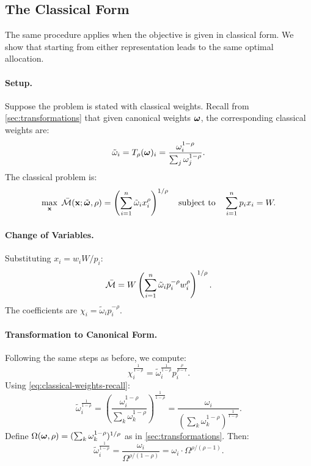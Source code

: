 \subsection{The Classical Form}
\label{subsec:classical-transform}

The same procedure applies when the objective is given in classical form. We show that starting from either representation leads to the same optimal allocation.

\paragraph{Setup.}
Suppose the problem is stated with classical weights. Recall from \cref{sec:transformations} that given canonical weights $\boldsymbol{\omega}$, the corresponding classical weights are:
\begin{equation}
\label{eq:classical-weights-recall}
\tilde{\omega}_i = T_\rho(\boldsymbol{\omega})_i = \frac{\omega_i^{1-\rho}}{\sum_j \omega_j^{1-\rho}}.
\end{equation}
The classical problem is:
\begin{equation}
\label{eq:classical-general}
\max_{\mathbf{x}} \; \bar{\mathcal{M}}(\mathbf{x}; \tilde{\boldsymbol{\omega}}, \rho) = \left( \sum_{i=1}^{n} \tilde{\omega}_i x_i^\rho \right)^{1/\rho} \quad \text{subject to} \quad \sum_{i=1}^{n} p_i x_i = W.
\end{equation}

\paragraph{Change of Variables.}
Substituting $x_i = w_i W / p_i$:
\[
\bar{\mathcal{M}} = W \left( \sum_{i=1}^{n} \tilde{\omega}_i p_i^{-\rho} w_i^\rho \right)^{1/\rho}.
\]
The coefficients are $\chi_i = \tilde{\omega}_i p_i^{-\rho}$.

\paragraph{Transformation to Canonical Form.}
Following the same steps as before, we compute:
\[
\chi_i^{\frac{1}{1-\rho}} = \tilde{\omega}_i^{\frac{1}{1-\rho}} p_i^{\frac{\rho}{\rho-1}}.
\]
Using \cref{eq:classical-weights-recall}:
\[
\tilde{\omega}_i^{\frac{1}{1-\rho}} = \left( \frac{\omega_i^{1-\rho}}{\sum_k \omega_k^{1-\rho}} \right)^{\frac{1}{1-\rho}} = \frac{\omega_i}{\left( \sum_k \omega_k^{1-\rho} \right)^{\frac{1}{1-\rho}}}.
\]
Define $\Omega(\boldsymbol{\omega}, \rho) = (\sum_k \omega_k^{1-\rho})^{1/\rho}$ as in \cref{sec:transformations}. Then:
\[
\tilde{\omega}_i^{\frac{1}{1-\rho}} = \frac{\omega_i}{\Omega^{\rho/(1-\rho)}} = \omega_i \cdot \Omega^{\rho/(\rho-1)}.
\]

